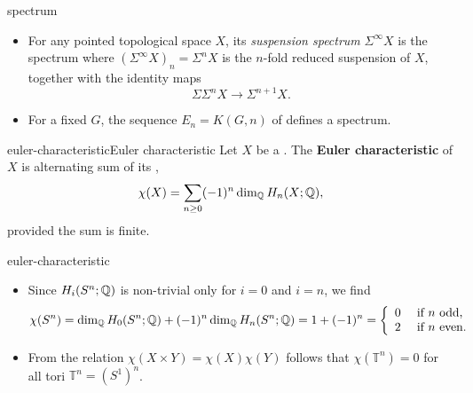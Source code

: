 
\begin{example}{spectrum}
    \begin{itemize}
        \item For any pointed topological space $X$, its \textit{suspension spectrum} $\Sigma^\infty X$ is the spectrum where $(\Sigma^\infty X)_n = \Sigma^n X$ is the $n$-fold reduced suspension of $X$, together with the identity maps
        \[ \Sigma \Sigma^n X \to \Sigma^{n + 1} X . \]
        \item For a fixed  $G$, the sequence $E_n = K(G, n)$ of  defines a spectrum.
    \end{itemize}
\end{example}

\begin{topic}{euler-characteristic}{Euler characteristic}
    Let $X$ be a . The \textbf{Euler characteristic} of $X$ is alternating sum of its ,
    \[ \chi(X) = \sum_{n \ge 0} (-1)^n \dim_{\mathbb{Q}} H_n(X; \mathbb{Q}) , \]
    provided the sum is finite.
\end{topic}

\begin{example}{euler-characteristic}
    \begin{itemize}
        \item Since $H_i(S^n; \mathbb{Q})$ is non-trivial only for $i = 0$ and $i = n$, we find
        \[ \chi(S^n) = \dim_{\mathbb{Q}} H_0(S^n; \mathbb{Q}) + (-1)^n \dim_{\mathbb{Q}} H_n(S^n; \mathbb{Q}) = 1 + (-1)^n = \left\{ \begin{array}{cl} 0 & \textup{ if $n$ odd}, \\ 2 & \textup{ if $n$ even}. \end{array} \right. \]
        \item From the relation $\chi(X \times Y) = \chi(X) \chi(Y)$ follows that $\chi(\mathbb{T}^n) = 0$ for all tori $\mathbb{T}^n = (S^1)^n$.
    \end{itemize}
\end{example}

